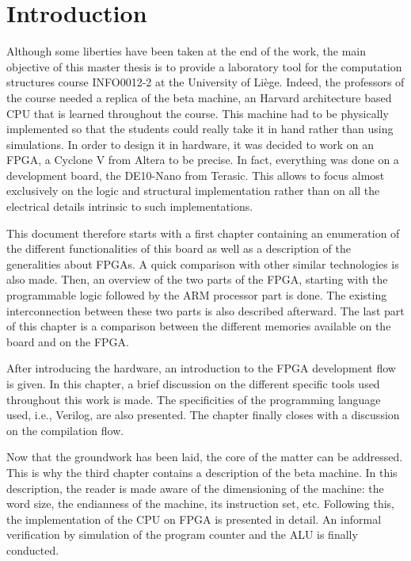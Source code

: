 \chapter*{Introduction}

Although some liberties have been taken at the end of the work, the main objective of this master thesis
is to provide a laboratory tool for the computation structures course INFO0012-2 at the University of Liège. Indeed, the professors of 
the course needed a replica of the beta machine, an Harvard architecture based CPU that is learned
throughout the course. This machine had to be physically implemented so that the students could 
really take it in hand rather than using simulations. In order to design it in hardware, it was 
decided to work on an FPGA, a Cyclone V from Altera to be precise. In fact, everything was done on a 
development board, the DE10-Nano from Terasic. This allows to focus almost exclusively on the logic and 
structural implementation rather than on all the electrical details intrinsic to such 
implementations.

This document therefore starts with a first chapter containing an enumeration of the different 
functionalities of this board as well as a description of the generalities about FPGAs. A quick 
comparison with other similar technologies is also made. Then, an overview of the two parts of the 
FPGA, starting with the programmable logic followed by the ARM processor part is done. The existing 
interconnection between these two parts is also described afterward. The last part of this chapter 
is a comparison between the different memories available on the board and on the FPGA.

After introducing the hardware, an introduction to the FPGA development flow is 
given. In this chapter, a brief discussion on the different specific tools used throughout this work 
is made. The specificities of the programming language used, i.e., Verilog, are also presented. The
chapter finally closes with a discussion on the compilation flow.

Now that the groundwork has been laid, the core of the matter can be addressed. This is why the 
third chapter contains a description of the beta machine. In this description, the reader is 
made aware of the dimensioning of the machine: the word size, the endianness of the machine, its 
instruction set, etc. Following this, the implementation of the CPU on FPGA is presented in detail. 
An informal verification by simulation of the program counter and the ALU is finally conducted.

